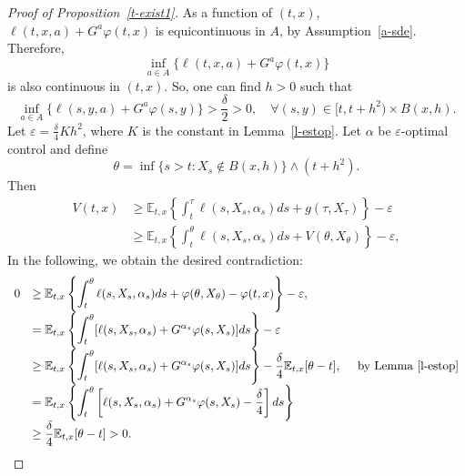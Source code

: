 \documentclass[11pt,reqno]{amsart}
\numberwithin{equation}{section}
\newcommand{\lemref}[1]{Lemma~{\rm \ref{#1}}}
\newcommand{\propref}[1]{Proposition~{\rm \ref{#1}}}
\newcommand{\asmref}[1]{Assumption~{\rm \ref{#1}}}
\begin{document}
\begin{proof}[Proof of \propref{t-exist1}]
  As a function of $(t,x)$, $\ell(t,x,a) + G^a \varphi(t,x)$
  is equicontinuous in $A$, by  \asmref{a-sde}. Therefore,
  \begin{equation*}
    \inf_{a\in A} \{\ell(t,x,a) + G^a \varphi(t,x)\}
  \end{equation*}
  is also continuous in $(t,x)$. So, one can find $h>0$ such that
  \begin{equation*}
    \inf_{a\in A} \{\ell(s,y,a) + G^a \varphi(s,y)\} > \frac \delta 2
    >0, \quad \forall (s,y) \in [t,t+h^2) \times B(x,h).
  \end{equation*}
  Let $\varepsilon = \frac \delta 4 K h^2$, where $K$ is
  the constant in \lemref{l-estop}. Let $\alpha$ be
  $\varepsilon$-optimal control and define
  \begin{equation*}
    \theta = \inf\{ s>t: X_s \notin B(x,h)\} \wedge (t+h^2).
  \end{equation*}
  Then
  $$\begin{array}{ll}
    V(t,x) & \displaystyle \ge \mathbb{E}_{t,x} \left\{\int_t^\tau \ell(s, X_s,
    \alpha_s) ds + g(\tau, X_{\tau})\right\} - \varepsilon \\
    & \displaystyle \ge \mathbb{E}_{t,x} \left\{\int_t^{\theta} \ell(s, X_s,
    \alpha_s) ds + V({\theta}, X_{\theta})\right\} -  \varepsilon,
  \end{array}$$
  In the following, we obtain the desired contradiction:
  $$\begin{array}{ll}
    0 &\displaystyle \ge \mathbb{E}_{t,x} \left\{\int_t^{\theta} \ell
    (s, X_s, \alpha_s) ds + \varphi
    ({\theta}, X_{\theta}) - \varphi(t,x)\right\} -
    \varepsilon, 
    \\  
    &\displaystyle = \mathbb{E}_{t,x}\left\{ \int_t^{\theta}
    [\ell (s, X_s, \alpha_s) +
    G^{\alpha_s}\varphi (s,X_s)] ds \right\} -
    \varepsilon \\ 
    & \displaystyle \ge \mathbb{E}_{t,x} \left\{\int_t^{\theta}
    [\ell (s, X_s, \alpha_s)  +
    G^{\alpha_s}\varphi (s,X_s)] ds \right\} - \frac
    \delta 4 \mathbb{E}_{t,x}[{\theta} -t], \quad \hbox{ by
      \lemref{l-estop}}\\  
    & \displaystyle = \mathbb{E}_{t,x} \left\{\int_t^{\theta}
    \left[\ell (s, X_s, \alpha_s)  +
    G^{\alpha_s}\varphi (s,X_s) - \frac
    \delta 4\right] ds \right\}\\ 
    & \displaystyle\ge \frac \delta 4 \mathbb{E}_{t,x}[{\theta} -t]  >0.
  \end{array}$$
\end{proof}
\end{document}
